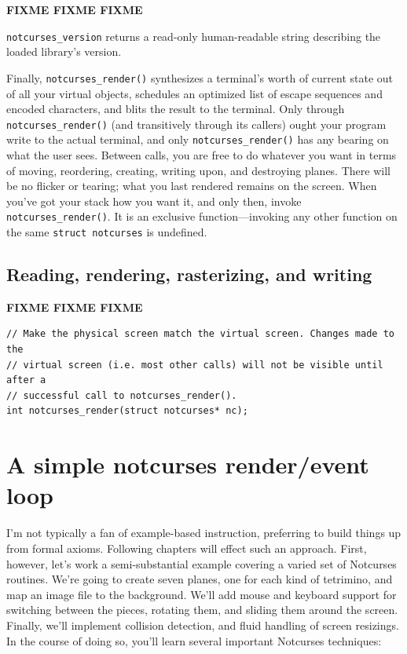 \documentclass[letterpaper,10pt]{article}
\begin{document}
\textbf{FIXME FIXME FIXME}

\texttt{notcurses\_version} returns a read-only human-readable string
describing the loaded library's version.

Finally, \texttt{notcurses\_render()} synthesizes a terminal's worth of current
state out of all your virtual objects, schedules an optimized list of escape
sequences and encoded characters, and blits the result to the terminal. Only
through \texttt{notcurses\_render()} (and transitively through its callers) ought
your program write to the actual terminal, and only \texttt{notcurses\_render()}
has any bearing on what the user sees. Between calls, you are free to do whatever
you want in terms of moving, reordering, creating, writing upon, and destroying
planes. There will be no flicker or tearing; what you last rendered remains on
the screen. When you've got your stack how you want it, and only then, invoke
\texttt{notcurses\_render()}. It is an exclusive function---invoking any other
function on the same \texttt{struct notcurses} is undefined.

\subsection{Reading, rendering, rasterizing, and writing}
\textbf{FIXME FIXME FIXME}

\begin{listing}[!htbp]
\begin{verbatim}
// Make the physical screen match the virtual screen. Changes made to the
// virtual screen (i.e. most other calls) will not be visible until after a
// successful call to notcurses_render().
int notcurses_render(struct notcurses* nc);
\end{verbatim}
\end{listing}

\newpage

\section{A simple notcurses render\slash event loop}
I'm not typically a fan of example-based instruction, preferring to build things
up from formal axioms. Following chapters will effect such an approach. First,
however, let's work a semi-substantial example covering a varied set of
Notcurses routines. We're going to create seven planes, one for each kind
of tetrimino, and map an image file to the background. We'll add mouse and
keyboard support for switching between the pieces, rotating them, and sliding
them around the screen. Finally, we'll implement collision detection, and
fluid handling of screen resizings. In the course of doing so, you'll learn
several important Notcurses techniques:
\end{document}
